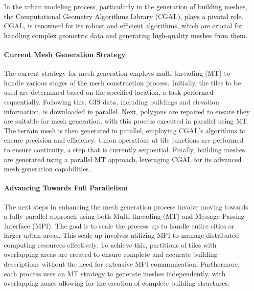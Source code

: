 \documentclass[runningheads]{llncs}
\begin{document}
In the urban modeling process, particularly in the generation of building meshes, the Computational Geometry Algorithms Library (CGAL), plays a pivotal role. CGAL, \cite{the_cgal_project_cgal_2024} is renowned for its robust and efficient algorithms, which are crucial for handling complex geometric data and generating high-quality meshes from them.

\paragraph{Current Mesh Generation Strategy}
The current strategy for mesh generation employs multi-threading (MT) to handle various stages of the mesh construction process. Initially, the tiles to be used are determined based on the specified location, a task performed sequentially. Following this, GIS data, including buildings and elevation information, is downloaded in parallel. Next, polygons are repaired to ensure they are suitable for mesh generation, with this process executed in parallel using MT. The terrain mesh is then generated in parallel, employing CGAL's algorithms to ensure precision and efficiency. Union operations at tile junctions are performed to ensure continuity, a step that is currently sequential. Finally, building meshes are generated using a parallel MT approach, leveraging CGAL for its advanced mesh generation capabilities.

\paragraph{Advancing Towards Full Parallelism}
The next steps in enhancing the mesh generation process involve moving towards a fully parallel approach using both Multi-threading (MT) and Message Passing Interface (MPI). The goal is to scale the process up to handle entire cities or larger urban areas. This scale-up involves utilizing MPI to manage distributed computing resources effectively. To achieve this, partitions of tiles with overlapping areas are created to ensure complete and accurate building descriptions without the need for extensive MPI communication. Furthermore, each process uses an MT strategy to generate meshes independently, with overlapping zones allowing for the creation of complete building structures.
\end{document}
